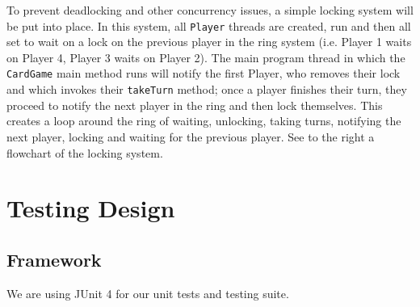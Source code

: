 \documentclass[a4paper, 11pt] {article}
\begin{document}
To prevent deadlocking and other concurrency issues, a simple locking system will be put into place. In this system, all \texttt{Player} threads are created, run and then all set to wait on a lock on the previous player in the ring system (i.e. Player 1 waits on Player 4, Player 3 waits on Player 2). The main program thread in which the \texttt{CardGame} main method runs will notify the first Player, who removes their lock and which invokes their \texttt{takeTurn} method; once a player finishes their turn, they proceed to notify the next player in the ring and then lock themselves. This creates a loop around the ring of waiting, unlocking, taking turns, notifying the next player, locking and waiting for the previous player. See to the right a flowchart of the locking system.


\pagebreak
\section*{Testing Design}
\subsection*{Framework}
We are using JUnit 4 for our unit tests and testing suite.
\end{document}
